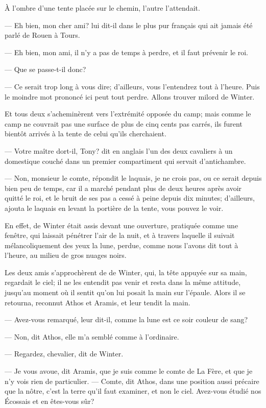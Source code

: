 À l'ombre d'une tente placée sur le chemin, l'autre l'attendait.

— Eh bien, mon cher ami? lui dit-il dans le plus pur français qui ait jamais été parlé de Rouen à Tours.

— Eh bien, mon ami, il n'y a pas de temps à perdre, et il faut prévenir le roi.

— Que se passe-t-il donc?

— Ce serait trop long à vous dire; d'ailleurs, vous l'entendrez tout à l'heure. Puis le moindre mot prononcé ici peut tout perdre. Allons trouver milord de Winter.

Et tous deux s'acheminèrent vers l'extrémité opposée du camp; mais comme le camp ne couvrait pas une surface de plus de cinq cents pas carrés, ils furent bientôt arrivés à la tente de celui qu'ils cherchaient.

— Votre maître dort-il, Tony? dit en anglais l'un des deux cavaliers à un domestique couché dans un premier compartiment qui servait d'antichambre.

— Non, monsieur le comte, répondit le laquais, je ne crois pas, ou ce serait depuis bien peu de temps, car il a marché pendant plus de deux heures après avoir quitté le roi, et le bruit de ses pas a cessé à peine depuis dix minutes; d'ailleurs, ajouta le laquais en levant la portière de la tente, vous pouvez le voir.

En effet, de Winter était assis devant une ouverture, pratiquée comme une fenêtre, qui laissait pénétrer l'air de la nuit, et à travers laquelle il suivait mélancoliquement des yeux la lune, perdue, comme nous l'avons dit tout à l'heure, au milieu de gros nuages noirs.

Les deux amis s'approchèrent de de Winter, qui, la tête appuyée sur sa main, regardait le ciel; il ne les entendit pas venir et resta dans la même attitude, jusqu'au moment où il sentit qu'on lui posait la main sur l'épaule. Alors il se retourna, reconnut Athos et Aramis, et leur tendit la main.

— Avez-vous remarqué, leur dit-il, comme la lune est ce soir couleur de sang?

— Non, dit Athos, elle m'a semblé comme à l'ordinaire.

— Regardez, chevalier, dit de Winter.

— Je vous avoue, dit Aramis, que je suis comme le comte de La Fère, et que je n'y vois rien de particulier.
— Comte, dit Athos, dans une position aussi précaire que la nôtre, c'est la terre qu'il faut examiner, et non le ciel. Avez-vous étudié nos Écossais et en êtes-vous sûr?


